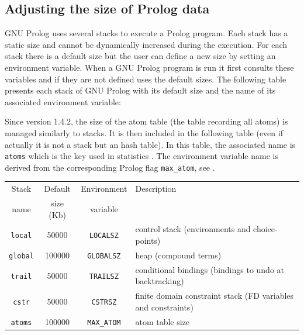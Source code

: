 \subsection{Adjusting the size of Prolog data}
\label{Adjusting-the-size-of-Prolog-stacks}
GNU Prolog uses several stacks to execute a Prolog program. Each stack has a
static size and cannot be dynamically increased during the execution. For
each stack there is a default size but the user can define a new size by
setting an environment variable. When a GNU Prolog program is run it first
consults these variables and if they are not defined uses the default sizes.
The following table presents each stack of GNU Prolog with its default size
and the name of its associated environment variable:

Since version 1.4.2, the size of the atom table (the table recording all atoms) 
is managed similarly to stacks. It is then included in the following table
(even if actually it is not a stack but an hash table).
In this table, the associated name is \texttt{atoms} which is the key used in statistics 
. The environment variable name is derived from the corresponding Prolog flag 
\texttt{max\_atom}, see .


\begin{tabular}{|c|c|c|l|}
\hline

Stack & Default   & Environment & Description \\
name  & size (Kb) & variable    & \\

\hline\hline

\texttt{local} & 50000 & \texttt{LOCALSZ} & control stack (environments
and choice-points) \\

\hline

\texttt{global} & 100000 & \texttt{GLOBALSZ} & heap (compound terms) \\

\hline

\texttt{trail} & 50000 & \texttt{TRAILSZ} & conditional bindings (bindings
to undo at backtracking) \\

\hline

\texttt{cstr} & 50000 & \texttt{CSTRSZ} & finite domain constraint stack
(FD variables and constraints) \\

\hline

\texttt{atoms} & 100000 & \texttt{MAX\_ATOM} & atom table size \\

\hline
\end{tabular}

